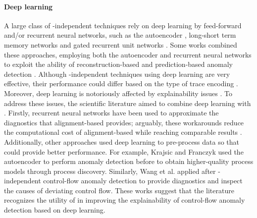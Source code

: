 \paragraph{Deep learning} A large class of -independent techniques rely on deep learning by feed-forward and/or recurrent neural networks, such as the autoencoder \cite{nolle2018processadautoencoders, vijayakamal2020bpaead, elaziz2023drlbpad, chinnaiah2024deepaead, kan2024aebasedelad}, long-short term memory networks \cite{du2017deeplog, lahann2022lstmadpi} and gated recurrent unit networks \cite{nolle2022binet, guan2023gruaebpad}. Some works combined these approaches, employing both the autoencoder and recurrent neural networks to exploit the ability of reconstruction-based and prediction-based anomaly detection \cite{yuan2021deeplstmaead, wang2022lstmaeaddiagnosis, guan2024wake}. Although -independent techniques using deep learning are very effective, their performance could differ based on the type of trace encoding \cite{tavares2021pmencodingad}. Moreover, deep learning is notoriously affected by explainability issues \cite{rawal2022trustworthyaiadvances}. To address these issues, the scientific literature aimed to combine deep learning with . Firstly, recurrent neural networks have been used to approximate the diagnostics that alignment-based  provides; arguably, these workarounds reduce the computational cost of alignment-based  while reaching comparable results \cite{nolle2020deepalign, boltenhagen2020costbasedlogtracesclassification}. Additionally, other approaches used deep learning to pre-process data so that  could provide better performance. For example, Krajsic and Franczyk \cite{krajsic2021vaeadonlinepm} used the autoencoder to perform anomaly detection before  to obtain higher-quality process models through process discovery. Similarly, Wang et al. \cite{wang2022lstmaeaddiagnosis} applied  after -independent control-flow anomaly detection to provide diagnostics and inspect the causes of deviating control flow. These works suggest that the literature recognizes the utility of  in improving the explainability of control-flow anomaly detection based on deep learning.

